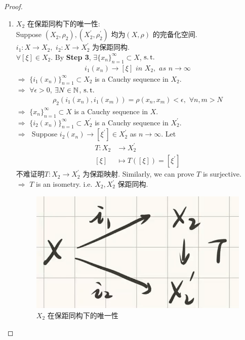 \begin{thm}
\begin{proof}
\begin{enumerate}
				\item $X_2$ 在保距同构下的唯一性: \\
				Suppose $(X_2 , \rho_2), (X_2^{'} , \rho_{2}^{'})$ 均为$(X , \rho)$ 的完备化空间. $i_1 : X \rightarrow X_2 , \,\, i_2 : X \rightarrow X_{2}^{'}$ 为保距同构. \\
				$\forall [\xi] \in X_2$. By \textbf{Step 3}, $\exists \{ x_n \}_{n = 1}^{\infty} \subset X$, $\operatorname{s.t.}$
				\begin{align}
					i_{1}(x_n) \to [\xi] \,\, in \,\, X_2 , \,\, as \,\, n \to \infty
				\end{align}
				$\Rightarrow \,\, \{i_1(x_n)\}_{n = 1}^{\infty} \subset X_2$ is a Cauchy sequence in $X_2$. \\
				$\Rightarrow \,\, \forall \epsilon > 0$, $\exists N \in \mathbb{N}$, $\operatorname{s.t.}$
				\begin{align}
					\rho_2(i_1(x_n) , i_1(x_m)) = \rho(x_n , x_m) < \epsilon , \,\, \forall n , m > N
				\end{align}
				$\Rightarrow \,\, \{ x_n \}_{n = 1}^{\infty} \subset X$ is a Cauchy sequence in $X$. \\
				$\Rightarrow \,\, \{ i_2(x_n) \}_{n = 1}^{\infty} \subset X_2^{'}$ is a Cauchy sequence in $X_2^{'}$. \\
				$\Rightarrow \,\,$ Suppose $i_2(x_n) \to [\xi^{'}] \in X_2^{'}$ as $n \to \infty$. Let
				\begin{align}
					T : X_2 &\longrightarrow X_2^{'} \\
					[\xi] &\longmapsto T([\xi]) = [\xi^{'}]
				\end{align}
				不难证明$T : X_2 \rightarrow X_2^{'}$ 为保距映射. Similarly, we can prove $T$ is surjective. \\
				$\Rightarrow \,\, T$ is an isometry. i.e. $X_2 , X_2^{'}$ 保距同构.
				
				\begin{figure}[thbp!]
					\centering
					\includegraphics[width=0.4\linewidth]{figure/1.2.4-1}
					\caption{$X_2$ 在保距同构下的唯一性}
					\label{pic : 1.2.4-1} %
				\end{figure}
			\end{enumerate}
		\end{proof}
		

\end{thm}

